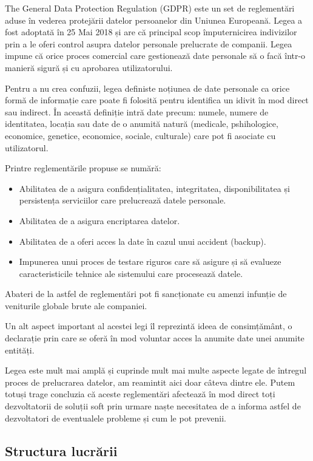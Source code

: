 \documentclass[12pt]{article}
\begin{document}
The General Data Protection Regulation (GDPR) este un set de reglementări aduse în vederea protejării datelor
persoanelor din Uniunea Europeană. Legea a fost adoptată în 25 Mai 2018 și are că principal scop împuternicirea
indivizilor prin a le oferi control asupra datelor personale prelucrate de companii. Legea impune că 
orice proces comercial care gestionează date personale să o facă într-o manieră sigură și cu aprobarea
utilizatorului.

Pentru a nu crea confuzii, legea definiste noțiunea de date personale ca orice formă de informație
care poate fi folosită pentru identifica un idivit în mod direct sau indirect. În această definiție intră
date precum: numele, numere de identitatea, locația sau date de o anumită natură (medicale, pshihologice, 
economice, genetice, economice, sociale, culturale) care pot fi asociate cu utilizatorul.

Printre reglementările propuse se numără:
\begin{itemize}
    \item Abilitatea de a asigura confidențialitatea, integritatea, disponibilitatea și persistența
    serviciilor care prelucrează datele personale.
    \item Abilitatea de a asigura encriptarea datelor.
    \item Abilitatea de a oferi acces la date în cazul unui accident (backup).
    \item Impunerea unui proces de testare riguros care să asigure și să evalueze caracteristicile
    tehnice ale sistemului care procesează datele.
\end{itemize}

Abateri de la astfel de reglementări pot fi sancționate cu amenzi infunție de
veniturile globale brute ale companiei.

Un alt aspect important al acestei legi îl reprezintă ideea de consimțământ, o declarație prin care
se oferă în mod voluntar acces la anumite date unei anumite entități. 

Legea este mult mai amplă și cuprinde mult mai multe aspecte legate de întregul proces
de prelucrarea datelor, am reamintit aici doar câteva dintre ele. 
Putem totuși trage concluzia că aceste reglementări afectează în mod direct toți
dezvoltatorii de soluții soft prin urmare naște necesitatea de a informa astfel de
dezvoltatori de eventualele probleme și cum le pot prevenii.

\newpage
\subsection{Structura lucrării}
\end{document}
